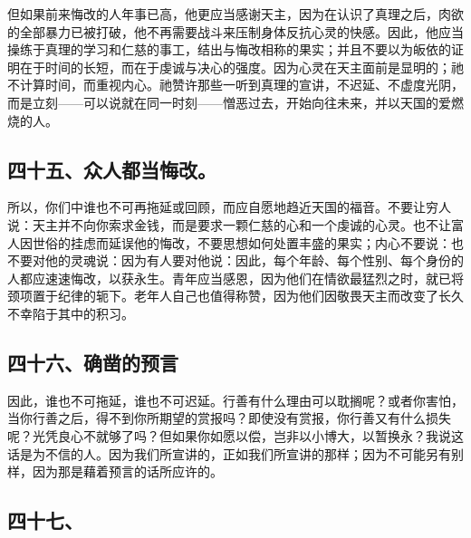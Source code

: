但如果前来悔改的人年事已高，他更应当感谢天主，因为在认识了真理之后，肉欲的全部暴力已被打破，他不再需要战斗来压制身体反抗心灵的快感。因此，他应当操练于真理的学习和仁慈的事工，结出与悔改相称的果实；并且不要以为皈依的证明在于时间的长短，而在于虔诚与决心的强度。因为心灵在天主面前是显明的；祂不计算时间，而重视内心。祂赞许那些一听到真理的宣讲，不迟延、不虚度光阴，而是立刻——可以说就在同一时刻——憎恶过去，开始向往未来，并以天国的爱燃烧的人。\par


\subsection{四十五、众人都当悔改。}

所以，你们中谁也不可再拖延或回顾，而应自愿地趋近天国的福音。不要让穷人说：天主并不向你索求金钱，而是要求一颗仁慈的心和一个虔诚的心灵。也不让富人因世俗的挂虑而延误他的悔改，不要思想如何处置丰盛的果实；内心不要说：也不要对他的灵魂说：因为有人要对他说：因此，每个年龄、每个性别、每个身份的人都应速速悔改，以获永生。青年应当感恩，因为他们在情欲最猛烈之时，就已将颈项置于纪律的轭下。老年人自己也值得称赞，因为他们因敬畏天主而改变了长久不幸陷于其中的积习。\par


\subsection{四十六、确凿的预言}

因此，谁也不可拖延，谁也不可迟延。行善有什么理由可以耽搁呢？或者你害怕，当你行善之后，得不到你所期望的赏报吗？即使没有赏报，你行善又有什么损失呢？光凭良心不就够了吗？但如果你如愿以偿，岂非以小博大，以暂换永？我说这话是为不信的人。因为我们所宣讲的，正如我们所宣讲的那样；因为不可能另有别样，因为那是藉着预言的话所应许的。\par


\subsection{四十七、}


